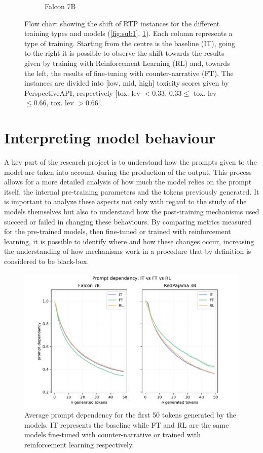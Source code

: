 \begin{figure}
\begin{subfigure}{.5\textwidth}
  \caption{Falcon 7B}
  \label{fig:sub2}
\end{subfigure}
\caption{Flow chart showing the shift of RTP instances for the different training types and models (\ref{fig:sub1}, \ref{fig:sub2}). Each column represents a type of training. Starting from the centre is the baseline (IT), going to the right it is possible to observe the shift towards the results given by training with Reinforcement Learning (RL) and, towards the left, the results of fine-tuning with counter-narrative (FT). The instances are divided into [low, mid, high] toxicity scores given by PerspectiveAPI, respectively [tox. lev $< 0.33$, $0.33 \leq$ tox. lev $\leq 0.66$, tox. lev $> 0.66$].}
\label{fig:flowchart}
\end{figure}



\section {Interpreting model behaviour}


A key part of the research project is to understand how the prompts given to the model are taken into account during the production of the output. This process allows for a more detailed analysis of how much the model relies on the prompt itself, the internal pre-training parameters and the tokens previously generated. It is important to analyze these aspects not only with regard to the study of the models themselves but also to understand how the post-training mechanisms used succeed or failed in changing these behaviours. By comparing metrics measured for the pre-trained models, then fine-tuned or trained with reinforcement learning, it is possible to identify where and how these changes occur, increasing the understanding of how mechanisms work in a procedure that by definition is considered to be black-box.

\begin{figure}
    \centering
    \includegraphics[width=\linewidth]{Figs/prompt-dependancy.pdf}
    \caption{Average prompt dependency for the first 50 tokens generated by the models. IT represents the baseline while FT and RL are the same models fine-tuned with counter-narrative or trained with reinforcement learning respectively.}
    \label{fig:prompt-dependancy}
\end{figure}

